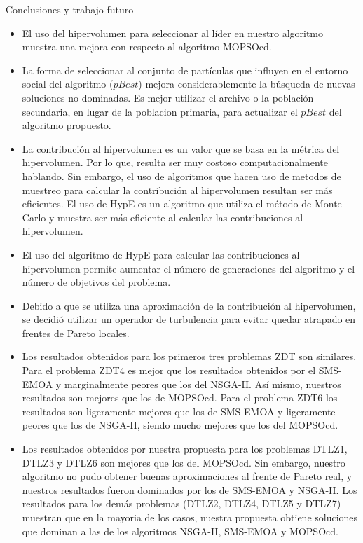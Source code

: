 \begin{chapter}{Conclusiones y trabajo futuro}
\begin{itemize}
  \item El uso del hipervolumen para seleccionar al l\'ider en nuestro algoritmo muestra una mejora con respecto al algoritmo MOPSOcd. 

  \item La forma de seleccionar al conjunto de part\'iculas que influyen en el entorno social  del algoritmo ($pBest$) mejora 
  considerablemente la b\'usqueda de nuevas soluciones no dominadas. Es mejor utilizar el archivo o la poblaci\'on
  secundaria, en lugar de la poblacion primaria, para actualizar el $pBest$ del algoritmo propuesto.

  \item La contribuci\'on al hipervolumen es un valor que se basa en la m\'etrica del hipervolumen. Por lo que, resulta ser muy costoso 
  computacionalmente hablando. Sin embargo, el uso de algoritmos que hacen uso de metodos 
  de muestreo para calcular la contribuci\'on al hipervolumen resultan ser m\'as eficientes. El uso de HypE 
  es un algoritmo que utiliza el m\'etodo de Monte Carlo y muestra ser m\'as eficiente al calcular las contribuciones al hipervolumen.

  \item El uso del algoritmo de HypE para calcular las contribuciones al hipervolumen permite aumentar el n\'umero de generaciones 
  del algoritmo y el n\'umero de objetivos del problema.

  \item Debido a que se utiliza una aproximaci\'on de la contribuci\'on al hipervolumen, se decidi\'o utilizar un operador de 
  turbulencia para evitar quedar atrapado en frentes de Pareto locales.

  \item Los resultados obtenidos \DIFaddbegin {}\DIFaddend para los primeros tres problemas ZDT son similares. Para el problema ZDT4 es mejor que 
  los resultados obtenidos por el SMS-EMOA y marginalmente peores que los del NSGA-II. As\'i mismo, nuestros resultados 
  son mejores que los de MOPSOcd. Para el problema ZDT6 los resultados son ligeramente mejores que los de SMS-EMOA 
  y ligeramente peores que los de NSGA-II, siendo mucho mejores que los del MOPSOcd.

  \item Los resultados obtenidos por nuestra propuesta para los problemas DTLZ1, DTLZ3 y DTLZ6 son mejores que los del MOPSOcd.
  Sin embargo, nuestro algoritmo no pudo obtener buenas aproximaciones al frente de Pareto real, y nuestros resultados fueron dominados
  por los de SMS-EMOA y NSGA-II. Los resultados para los dem\'as problemas (DTLZ2, DTLZ4, DTLZ5 y DTLZ7) muestran que en la mayoria 
  de los casos, nuestra propuesta obtiene soluciones que dominan a las de los algoritmos NSGA-II, SMS-EMOA y MOPSOcd.


\end{itemize}
\end{chapter}
